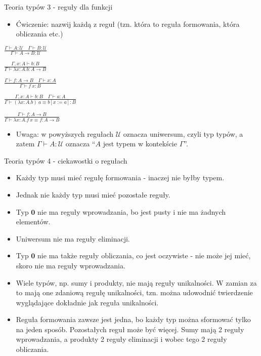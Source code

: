 \documentclass{beamer}
\newcommand{\U}{\mathcal{U}}
\begin{document}
\begin{frame}{Teoria typów 3 - reguły dla funkcji}

\begin{itemize}
	\item Ćwiczenie: nazwij każdą z reguł (tzn. która to reguła formowania, która obliczania etc.)
\end{itemize}

\begin{center}
	$\displaystyle \frac{\Gamma \vdash A : \U \quad \Gamma \vdash B : \U}{\Gamma \vdash A \to B : \U}$
\end{center}
\begin{center}
	$\displaystyle \frac{\Gamma, x : A \vdash b : B}{\Gamma \vdash \lambda x:A.b : A \to B}$
\end{center}
\begin{center}
	$\displaystyle \frac{\Gamma \vdash f : A \to B \quad \Gamma \vdash x : A}{\Gamma \vdash f\ x : B}$
\end{center}
\begin{center}
	$\displaystyle \frac{\Gamma, x : A \vdash b : B \quad \Gamma \vdash a : A}{\Gamma \vdash (\lambda x:A.b)\ a \equiv b[x := a] : B}$
\end{center}
\begin{center}
	$\displaystyle \frac{\Gamma \vdash f : A \to B}{\Gamma \vdash \lambda x:A.f\ x \equiv f : A \to B}$
\end{center}

\begin{itemize}
	\item Uwaga: w powyższych regułach $\U$ oznacza uniwersum, czyli typ typów, a zatem $\Gamma \vdash A : \U$ oznacza ``$A$ jest typem w kontekście $\Gamma$''.
\end{itemize}

\end{frame}

\begin{frame}{Teoria typów 4 - ciekawostki o regułach}
\begin{itemize}
	\item Każdy typ musi mieć regułę formowania - inaczej nie byłby typem.
	\item Jednak nie każdy typ musi mieć pozostałe reguły.
	\item Typ $\textbf{0}$ nie ma reguły wprowadzania, bo jest pusty i nie ma żadnych elementów.
	\item Uniwersum nie ma reguły eliminacji.
	\item Typ $\textbf{0}$ nie ma także reguły obliczania, co jest oczywiste - nie może jej mieć, skoro nie ma reguły wprowadzania.
	\item Wiele typów, np. sumy i produkty, nie mają reguły unikalności. W zamian za to mają one zdaniową regułę unikalności, tzn. można udowodnić twierdzenie wyglądające dokładnie jak reguła unikalności.
	\item Reguła formowania zawsze jest jedna, bo każdy typ można sformować tylko na jeden sposób. Pozostałych reguł może być więcej. Sumy mają 2 reguły wprowadzania, a produkty 2 reguły eliminacji i wobec tego 2 reguły obliczania.
\end{itemize}
\end{frame}
\end{document}
